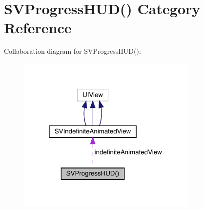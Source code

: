 \hypertarget{category_s_v_progress_h_u_d_07_08}{}\section{S\+V\+Progress\+H\+UD() Category Reference}
\label{category_s_v_progress_h_u_d_07_08}


Collaboration diagram for S\+V\+Progress\+H\+UD()\+:\nopagebreak
\begin{figure}[H]
\begin{center}
\leavevmode
\includegraphics[width=253pt]{category_s_v_progress_h_u_d_07_08__coll__graph}
\end{center}
\end{figure}
